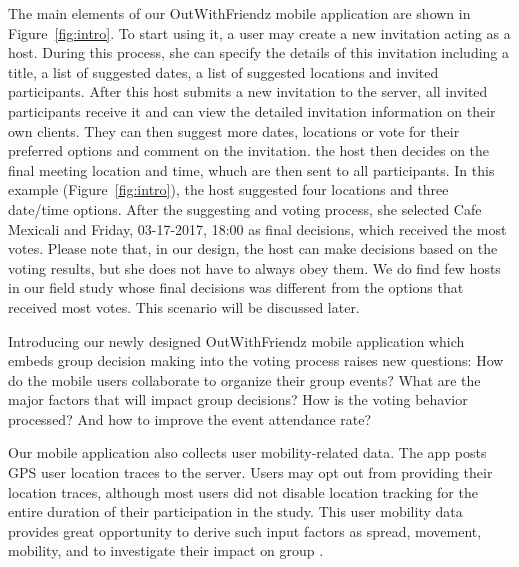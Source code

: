 The main elements of our OutWithFriendz mobile application are shown in 
Figure~\ref{fig:intro}. To start using it, a user may create a new invitation acting
as a host. During this process, she can specify the details of this invitation including
a title, a list of suggested dates, a list of suggested locations and invited participants.
After this host submits a new invitation to the server, all invited participants
receive it and can view the detailed invitation information on their own clients. They 
can then suggest more dates, locations or vote for their preferred options and comment 
on the invitation.  the host then
decides on the final meeting location and time, whuch are then sent to all participants. 
In this example (Figure~\ref{fig:intro}), the host suggested four locations and three date/time options. After the suggesting and voting process, she selected Cafe Mexicali and Friday, 03-17-2017, 18:00 as final decisions, which received 
the most votes. Please note that, in our design, the host can make decisions based on the 
voting results, but she does not have to always obey them. We do find few hosts in our field study
whose final decisions was different from the options that received most votes.
This scenario will be discussed later.

Introducing our newly designed OutWithFriendz mobile application which embeds group
decision making into the voting process raises new questions: How do the mobile  users collaborate
to organize their group events? What are the major factors that will impact group decisions?
How is the voting behavior processed? And how to improve the event attendance rate?

Our mobile application also collects user mobility-related data. The app posts GPS user 
location traces to the server. Users may opt out from providing their location traces, although
most users did not disable location tracking for the entire duration of their participation in the
study. This user mobility data provides great opportunity to derive such input factors as spread,
movement, mobility, and to investigate their impact on group . 


\begin{comment}
(1) mobile group decision making
(2) use case: figure~\ref{fig:intro}
(3) important questions
(4) what we have done and contributions
\end{comment}

